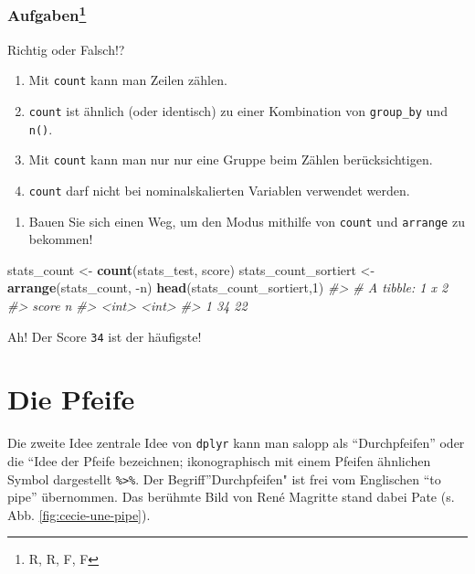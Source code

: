 \documentclass[12pt,ngerman,]{book}
\makeatletter
\newenvironment{Shaded}{\begin{snugshade}}{\end{snugshade}}
\newcommand{\KeywordTok}[1]{\textcolor[rgb]{0.13,0.29,0.53}{\textbf{{#1}}}}
\newcommand{\DecValTok}[1]{\textcolor[rgb]{0.00,0.00,0.81}{{#1}}}
\newcommand{\StringTok}[1]{\textcolor[rgb]{0.31,0.60,0.02}{{#1}}}
\newcommand{\CommentTok}[1]{\textcolor[rgb]{0.56,0.35,0.01}{\textit{{#1}}}}
\newcommand{\NormalTok}[1]{{#1}}
\providecommand{\tightlist}{%
  \setlength{\itemsep}{0pt}\setlength{\parskip}{0pt}}
\let\rmarkdownfootnote\footnote%
\def\footnote{\protect\rmarkdownfootnote}
\newenvironment{kframe}{%
\medskip{}
\setlength{\fboxsep}{.8em}
 \def\at@end@of@kframe{}%
 \ifinner\ifhmode%
  \def\at@end@of@kframe{\end{minipage}}%
  \begin{minipage}{\columnwidth}%
 \fi\fi%
 \def\FrameCommand##1{\hskip\@totalleftmargin \hskip-\fboxsep
 \colorbox{shadecolor}{##1}\hskip-\fboxsep
     \hskip-\linewidth \hskip-\@totalleftmargin \hskip\columnwidth}%
 \MakeFramed {\advance\hsize-\width
   \@totalleftmargin\z@ \linewidth\hsize
   \@setminipage}}%
 {\par\unskip\endMakeFramed%
 \at@end@of@kframe}
\renewenvironment{Shaded}{\begin{kframe}}{\end{kframe}}
\let\BeginKnitrBlock\begin \let\EndKnitrBlock\end
\makeatother
\begin{document}
\subsubsection[Aufgaben]{\texorpdfstring{Aufgaben\footnote{R, R, F, F}}{Aufgaben}}\label{aufgaben-8}

\BeginKnitrBlock{rmdexercises}
Richtig oder Falsch!?

\begin{enumerate}
\def\labelenumi{\arabic{enumi}.}
\tightlist
\item
  Mit \texttt{count} kann man Zeilen zählen.
\item
  \texttt{count} ist ähnlich (oder identisch) zu einer Kombination von
  \texttt{group\_by} und \texttt{n()}.
\item
  Mit \texttt{count} kann man nur nur eine Gruppe beim Zählen
  berücksichtigen.
\item
  \texttt{count} darf nicht bei nominalskalierten Variablen verwendet
  werden.
\end{enumerate}
\EndKnitrBlock{rmdexercises}

\begin{enumerate}
\def\labelenumi{\arabic{enumi}.}
\tightlist
\item
  Bauen Sie sich einen Weg, um den Modus mithilfe von \texttt{count} und
  \texttt{arrange} zu bekommen!
\end{enumerate}

\begin{Shaded}
\begin{Highlighting}[]
\NormalTok{stats_count <-}\StringTok{ }\KeywordTok{count}\NormalTok{(stats_test, score)}
\NormalTok{stats_count_sortiert <-}\StringTok{ }\KeywordTok{arrange}\NormalTok{(stats_count, -n)}
\KeywordTok{head}\NormalTok{(stats_count_sortiert,}\DecValTok{1}\NormalTok{)}
\CommentTok{#> # A tibble: 1 x 2}
\CommentTok{#>   score     n}
\CommentTok{#>   <int> <int>}
\CommentTok{#> 1    34    22}
\end{Highlighting}
\end{Shaded}

Ah! Der Score \texttt{34} ist der häufigste!

\section{Die Pfeife}\label{die-pfeife}

Die zweite Idee zentrale Idee von \texttt{dplyr} kann man salopp als
``Durchpfeifen'' oder die ``Idee der
Pfeife bezeichnen; ikonographisch mit einem Pfeifen
ähnlichen Symbol dargestellt \texttt{\%\textgreater{}\%}. Der
Begriff''Durchpfeifen" ist frei vom Englischen ``to pipe'' übernommen.
Das berühmte Bild von René Magritte stand dabei Pate (s. Abb.
\ref{fig:cecie-une-pipe}).
\end{document}
